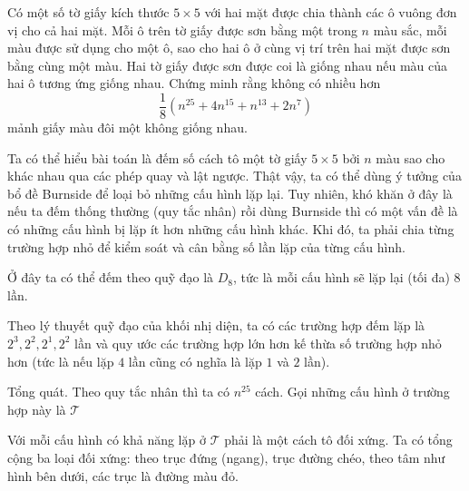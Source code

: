 \documentclass[11pt]{scrartcl}
\begin{document}
\begin{itemize}[label=, leftmargin=0em, itemsep=0.5em]
    \begin{bt} 
    Có một số tờ giấy kích thước $5\times 5$ với hai mặt được chia thành các ô vuông đơn vị cho cả hai mặt. Mỗi ô trên tờ giấy được sơn bằng một trong $n$ màu sắc, mỗi màu được sử dụng cho một ô, sao cho hai ô ở cùng vị trí trên hai mặt được sơn bằng cùng một màu. Hai tờ giấy được sơn được coi là giống nhau nếu màu của hai ô tương ứng giống nhau. Chứng minh rằng không có nhiều hơn
    \[
        \frac{1}{8}\left(n^{25}+ 4n^{15} + n^{13} + 2n^7\right)
    \]
    mảnh giấy màu đôi một không giống nhau.
    \end{bt}
        \begin{sol}
            
            Ta có thể hiểu bài toán là đếm số cách tô một tờ giấy $5 \times 5$ bởi $n$ màu sao cho khác nhau qua các phép quay và lật ngược. Thật vậy, ta có thể dùng ý tưởng của bổ đề Burnside để loại bỏ những cấu hình lặp lại. Tuy nhiên, khó khăn ở đây là nếu ta đếm thống thường (quy tắc nhân) rồi dùng Burnside thì có một vấn đề là có những cấu hình bị lặp ít hơn những cấu hình khác. Khi đó, ta phải chia từng trường hợp nhỏ để kiểm soát và cân bằng số lần lặp của từng cấu hình.
            
            Ở đây ta có thể đếm theo quỹ đạo là $D_8$, tức là mỗi cấu hình sẽ lặp lại (tối đa) 8 lần.

            Theo lý thuyết quỹ đạo của khối nhị diện, ta có các trường hợp đếm lặp là $2^3,2^2,2^1,2^2$ lần và quy ước các trường hợp lớn hơn kế thừa số trường hợp nhỏ hơn (tức là nếu lặp $4$ lần cũng có nghĩa là lặp $1$ và $2$ lần).

             Tổng quát. Theo quy tắc nhân thì ta có $n^{25}$ cách. Gọi những cấu hình ở trường hợp này là $\mathcal{T}$

            Với mỗi cấu hình có khả năng lặp ở $\mathcal{T}$ phải là một cách tô đối xứng. Ta có tổng cộng ba loại đối xứng: theo trục đứng (ngang), trục đường chéo, theo tâm như hình bên dưới, các trục là đường màu đỏ.


\end{sol}
\end{itemize}
\end{document}
